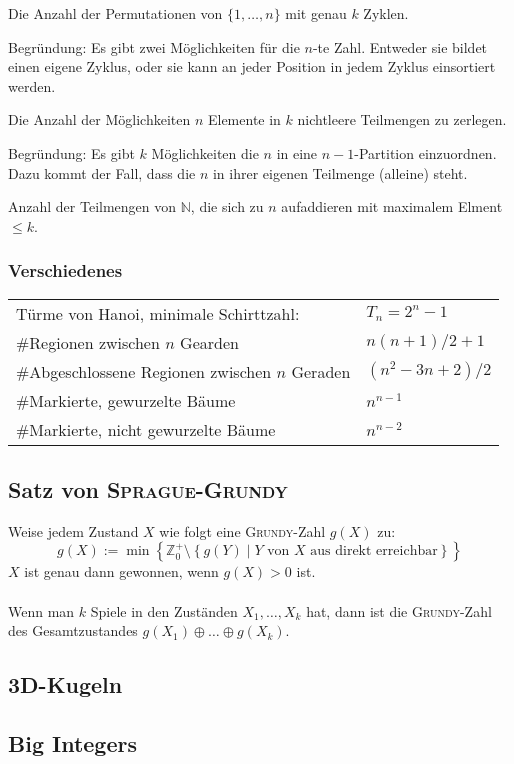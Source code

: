 \begin{bem}\label{bem:stirling1}
	Die Anzahl der Permutationen von $\{1, \ldots, n\}$ mit genau $k$ Zyklen.

	Begründung: Es gibt zwei Möglichkeiten für die $n$-te Zahl. Entweder sie
	bildet einen eigene Zyklus, oder sie kann an jeder Position in jedem Zyklus
	einsortiert werden.
\end{bem}

\begin{bem}\label{bem:stirling2}
	Die Anzahl der Möglichkeiten $n$ Elemente in $k$ nichtleere Teilmengen zu zerlegen.

	Begründung: Es gibt $k$ Möglichkeiten die $n$ in eine $n-1$-Partition
	einzuordnen. Dazu kommt der Fall, dass die $n$ in ihrer eigenen Teilmenge
	(alleine) steht.
\end{bem}

\begin{bem}\label{bem:integerPartitions}
	Anzahl der Teilmengen von $\mathbb{N}$, die sich zu $n$ aufaddieren mit
	maximalem Elment $\leq k$.
\end{bem}

\subsubsection{Verschiedenes}
\begin{tabular}{|l|l|}
	\hline
	Türme von Hanoi, minimale Schirttzahl:					& $T_n = 2^n - 1$ \\
	\#Regionen zwischen $n$ Gearden									& $n\left(n + 1\right) / 2 + 1$ \\
	\#Abgeschlossene Regionen zwischen $n$ Geraden	& $\left(n^2 - 3n + 2\right) / 2$ \\
	\#Markierte, gewurzelte Bäume										& $n^{n-1}$ \\
	\#Markierte, nicht gewurzelte Bäume							& $n^{n-2}$ \\
	\hline
\end{tabular}

\subsection{Satz von \textsc{Sprague-Grundy}}
Weise jedem Zustand $X$ wie folgt eine \textsc{Grundy}-Zahl $g\left(X\right)$ zu:
\[
	g\left(X\right) := \min\left\{
		\mathbb{Z}_0^+ \setminus
		\left\{g\left(Y\right) \mid Y \text{ von } X \text{ aus direkt erreichbar}\right\}
	\right\} 
\]
$X$ ist genau dann gewonnen, wenn $g\left(X\right) > 0$ ist.\\\\
Wenn man $k$ Spiele in den Zuständen $X_1, \ldots, X_k$ hat, dann ist die \textsc{Grundy}-Zahl des Gesamtzustandes $g\left(X_1\right) \oplus \ldots \oplus g\left(X_k\right)$.


\subsection{3D-Kugeln}


\subsection{Big Integers}

